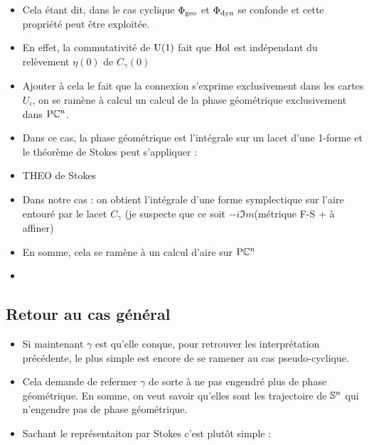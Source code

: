 \begin{itemize}
	
	\item Cela étant dit, dans le cas cyclique $\phaseg$ et $\phased$ se confonde et cette propriété peut être exploitée.
	
	\item En effet,  la commutativité de $\U{1}$ fait que $\Hol$ est indépendant du relèvement $\eta(0)$ de $C_\gamma(0)$ 
	
	\item Ajouter à cela le fait que la connexion s'exprime exclusivement dans les cartes $U_i$, on se ramène à calcul un calcul de la phase géométrique exclusivement dans $\PC{n}$.
	
	\item Dans ce cas, la phase géométrique est l'intégrale sur un lacet d'une 1-forme et le théorème de Stokes peut s'appliquer :
	
	\item THEO de Stokes
	
	\item Dans notre cas : on obtient l’intégrale d'une forme symplectique sur l'aire entouré par le lacet $C_\gamma$ (je suspecte que ce soit $-i\Im m$(métrique F-S + à affiner) 
	
	\item En somme, cela se ramène à un calcul d'aire sur $\PC{n}$
	
	\item {}
	
\end{itemize}


\subsection{Retour au cas général}

\begin{itemize}
	\item Si maintenant $\gamma$ est qu'elle conque, pour retrouver les interprétation précédente, le plus simple est encore de se ramener au cas pseudo-cyclique.
	
	\item Cela demande de refermer $\gamma$ de sorte à ne pas engendré plus de phase géométrique. En somme, on veut savoir qu'elles sont les trajectoire de $\S{n}$ qui n'engendre pas de phase géométrique.
	
	\item Sachant le représentaiton par Stokes c'est plutôt simple : 
\end{itemize}



